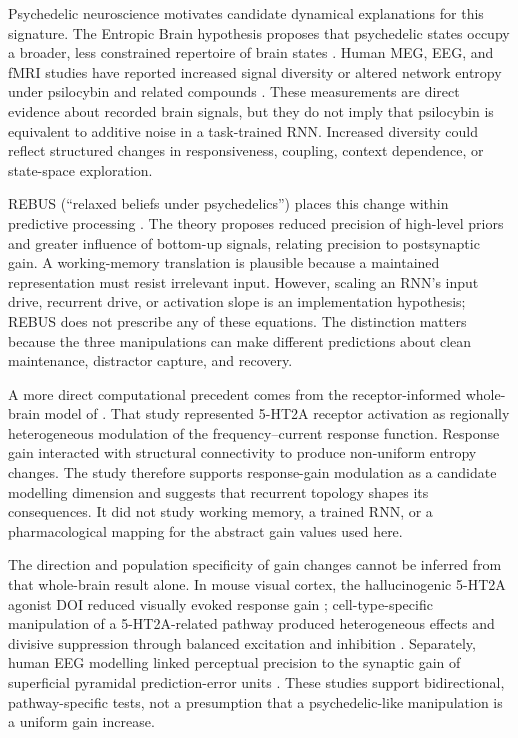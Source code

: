 \documentclass[12pt,a4paper]{article}
\begin{document}
Psychedelic neuroscience motivates candidate dynamical explanations for this
signature. The
Entropic Brain hypothesis proposes that psychedelic states occupy a broader,
less constrained repertoire of brain states \citep{carhartharris2014entropic}.
Human MEG, EEG, and fMRI studies have reported increased signal diversity or
altered network entropy under psilocybin and related compounds
\citep{schartner2017increased,timmermann2019neural,viol2017shannon}. These
measurements are direct evidence about recorded brain signals, but they do not
imply that psilocybin is equivalent to additive noise in a task-trained RNN.
Increased diversity could reflect structured changes in responsiveness,
coupling, context dependence, or state-space exploration.

REBUS (``relaxed beliefs under psychedelics'') places this change within
predictive processing \citep{carhartharris2019rebus}. The theory proposes
reduced precision of high-level priors and greater influence of bottom-up
signals, relating precision to postsynaptic gain. A working-memory translation
is plausible because a maintained representation must resist irrelevant input.
However, scaling an RNN's input drive, recurrent drive, or activation slope is
an implementation hypothesis; REBUS does not prescribe any of these equations.
The distinction matters because the three manipulations can make different
predictions about clean maintenance, distractor capture, and recovery.

A more direct computational precedent comes from the receptor-informed
whole-brain model of \citet{herzog2023mechanistic}. That study represented
5-HT2A receptor activation as regionally heterogeneous modulation of the
frequency--current response function. Response gain interacted with structural
connectivity to produce non-uniform entropy changes. The study therefore
supports response-gain modulation as a candidate modelling dimension and
suggests that recurrent topology shapes its consequences. It did not study
working memory, a trained RNN, or a pharmacological mapping for the abstract
gain values used here.

The direction and population specificity of gain changes cannot be inferred
from that whole-brain result alone. In mouse visual cortex, the hallucinogenic
5-HT2A agonist DOI reduced visually evoked response gain
\citep{michaiel2019visualgain}; cell-type-specific manipulation of a
5-HT2A-related pathway produced heterogeneous effects and divisive suppression
through balanced excitation and inhibition \citep{barzan2024gaincontrol}.
Separately, human EEG modelling linked perceptual precision to the synaptic
gain of superficial pyramidal prediction-error units
\citep{brown2012precision}. These studies support bidirectional,
pathway-specific tests, not a presumption that a psychedelic-like manipulation
is a uniform gain increase.
\end{document}
